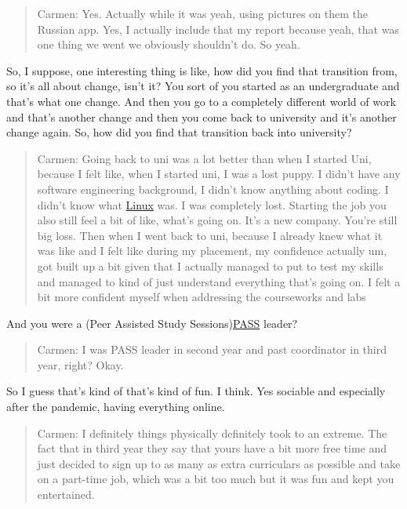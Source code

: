 \documentclass[
]{book}
\begin{document}
\begin{quote}
Carmen: Yes. Actually while it was yeah, using pictures on them the Russian app. Yes, I actually include that my report because yeah, that was one thing we went we obviously shouldn't do. So yeah.
\end{quote}

So, I suppose, one interesting thing is like, how did you find that transition from, so it's all about change, isn't it? You sort of you started as an undergraduate and that's what one change. And then you go to a completely different world of work and that's another change and then you come back to university and it's another change again. So, how did you find that transition back into university?

\begin{quote}
Carmen: Going back to uni was a lot better than when I started Uni, because I felt like, when I started uni, I was a lost puppy. I didn't have any software engineering background, I didn't know anything about coding. I didn't know what \href{https://en.wikipedia.org/wiki/Linux}{Linux} was. I was completely lost. Starting the job you also still feel a bit of like, what's going on. It's a new company. You're still big loss. Then when I went back to uni, because I already knew what it was like and I felt like during my placement, my confidence actually um, got built up a bit given that I actually managed to put to test my skills and managed to kind of just understand everything that's going on. I felt a bit more confident myself when addressing the courseworks and labs
\end{quote}

And you were a (Peer Assisted Study Sessions)\href{http://www.pass.manchester.ac.uk/}{PASS} leader?

\begin{quote}
Carmen: I was PASS leader in second year and past coordinator in third year, right? Okay.
\end{quote}

So I guess that's kind of that's kind of fun. I think. Yes sociable and especially after the pandemic, having everything online.

\begin{quote}
Carmen: I definitely things physically definitely took to an extreme. The fact that in third year they say that yours have a bit more free time and just decided to sign up to as many as extra curriculars as possible and take on a part-time job, which was a bit too much but it was fun and kept you entertained.
\end{quote}
\end{document}
